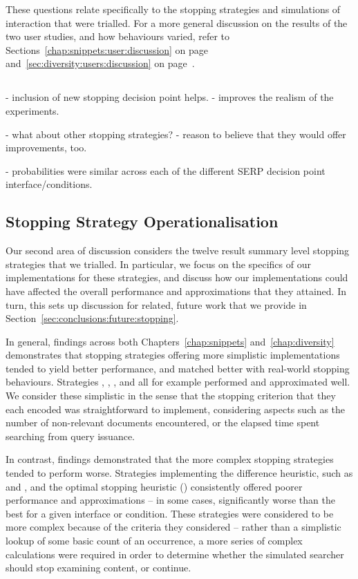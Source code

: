 These questions relate specifically to the stopping strategies and simulations of interaction that were trialled. For a more general discussion on the results of the two user studies, and how behaviours varied, refer to Sections~\ref{chap:snippets:user:discussion} on page~\pageref{chap:snippets:user:discussion} and~\ref{sec:diversity:users:discussion} on page~\pageref{sec:diversity:users:discussion}.

\subsection{}

- inclusion of new stopping decision point helps.
- improves the realism of the experiments.

- what about other stopping strategies?
    - reason to believe that they would offer improvements, too.

- probabilities were similar across each of the different SERP decision point interface/conditions.

\subsection{Stopping Strategy Operationalisation}
Our second area of discussion considers the twelve result summary level stopping strategies that we trialled. In particular, we focus on the specifics of our implementations for these strategies, and discuss how our implementations could have affected the overall performance and approximations that they attained. In turn, this sets up discussion for related, future work that we provide in Section~\ref{sec:conclusions:future:stopping}.

In general, findings across both Chapters~\ref{chap:snippets} and~\ref{chap:diversity} demonstrates that stopping strategies offering more simplistic implementations tended to yield better performance, and matched better with real-world stopping behaviours. Strategies , , ,  and  all for example performed and approximated well. We consider these simplistic in the sense that the stopping criterion that they each encoded was straightforward to implement, considering aspects such as the number of non-relevant documents encountered, or the elapsed time spent searching from query issuance.

In contrast, findings demonstrated that the more complex stopping strategies tended to perform worse. Strategies implementing the difference heuristic, such as  and , and the optimal stopping heuristic () consistently offered poorer performance and approximations -- in some cases, significantly worse than the best for a given interface or condition. These strategies were considered to be more complex because of the criteria they considered -- rather than a simplistic lookup of some basic count of an occurrence, a more series of complex calculations were required in order to determine whether the simulated searcher should stop examining content, or continue.

